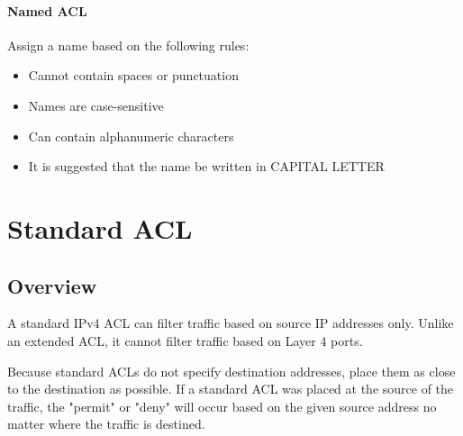 \paragraph{Named ACL} Assign a name based on the following rules:
	\begin{itemize}
		\item Cannot contain spaces or punctuation
		\item Names are case-sensitive
		\item Can contain alphanumeric characters
		\item It is suggested that the name be written in CAPITAL LETTER
	\end{itemize}	
\section{Standard ACL}
\subsection{Overview}
A standard IPv4 ACL can filter traffic based on source IP addresses only. Unlike an extended ACL, it cannot filter traffic based on Layer 4 ports.\par 
Because standard ACLs do not specify destination addresses, place them as close to the destination as possible. If a standard ACL was placed at the source of the traffic, the "permit" or "deny" will occur based on the given source address no matter where the traffic is destined.\par 
